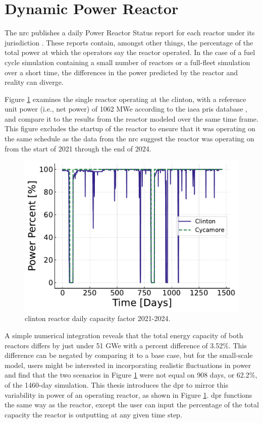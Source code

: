 \section{Dynamic Power Reactor}
\label{sec:dpr_method}

The \gls{nrc} publishes a daily Power Reactor Status report for each reactor
under its jurisdiction \cite{nrc_power_2025}. These reports contain, amongst
other things, the percentage of the total power at which the operators
say the reactor operated. In the case of a fuel cycle simulation containing a
small number of reactors or a full-fleet simulation over a short time, the
differences in the power predicted by the \cycamore reactor and reality can
diverge.

Figure \ref{fig:pp_full} examines the single reactor operating at the
\gls{clinton}, with a reference unit power (i.e., net power) of 1062
MWe according to the \gls{iaea} \gls{pris} database \cite{IAEA_PRIS}, and
compare it to the results from the \cycamore reactor modeled over the same time
frame. This figure excludes the startup of the \cycamore reactor to ensure that it was operating on the same schedule as the data from the \gls{nrc} suggest the reactor was operating on from the start of 2021 through the end of 2024.

\begin{figure}[H]
  \centering
  \includegraphics[width=0.7\linewidth]{images/power_reactor/power_percent_clinton_fake.pdf}
  \caption{\gls{clinton} reactor daily capacity factor 2021-2024.}
  \label{fig:pp_full}
\end{figure}

A simple numerical integration reveals that the total energy capacity of both reactors differs by just under 51 GWe with a percent difference of 3.52\%. This difference can be negated by comparing it to a base case, but for the small-scale model, users might be interested in incorporating realistic fluctuations in power and find that the two scenarios in Figure \ref{fig:pp_full} were not equal on 908 days, or 62.2\%, of the 1460-day simulation. This thesis introduces the \gls{dpr} to mirror this variability in power of an operating reactor, as shown in Figure \ref{fig:pp_full}. \gls{dpr} functions the same way as the \cycamore reactor, except the user can input the percentage of the total capacity the reactor is outputting at any given time step.


